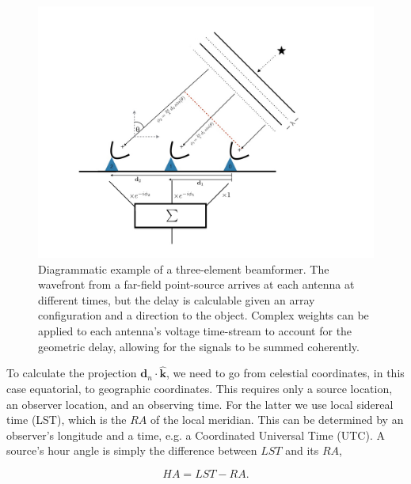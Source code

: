 \begin{figure}[!h]
\label{fig-bf_diagram}
\begin{center}
\includegraphics[trim={1.in, 1.in, 2.5in, 1.in}, width=1\textwidth]{./figures/beamforming/beamforming_diagram.jpeg} 
\vspace{0.0cm}
\caption[abc]{Diagrammatic example of a three-element beamformer. The 
wavefront from a far-field point-source arrives at each antenna 
at different times, but the delay is calculable given an array 
configuration and a direction to the object. Complex weights can 
be applied to each antenna's voltage time-stream to account 
for the geometric delay, allowing for the signals to be summed coherently.}  
\vspace{-0.4cm}   
\end{center}
\end{figure}

To calculate the projection $\mathbf{d}_n \cdot  {\mathbf{\hat{k}}}$, we 
need to go from celestial coordinates, in this case equatorial, to geographic 
coordinates. This requires only a source location, an observer location, and an 
observing time. For the latter we use local 
sidereal time (LST), which is the $RA$ of the local meridian. This can be determined  
by an observer's longitude and a time, e.g. a Coordinated Universal Time (UTC). 
A source's hour angle is simply the difference between $LST$ and its $RA$,

\begin{equation}
HA = LST - RA.
\end{equation}

